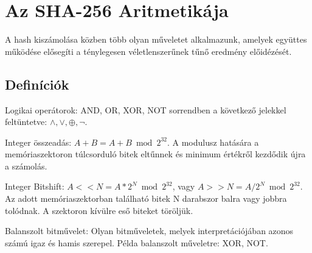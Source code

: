 \section{Az SHA-256 Aritmetikája}

A hash kiszámolása közben több olyan műveletet alkalmazunk, amelyek együttes működése elősegíti a ténylegesen véletlenszerűnek tűnő eredmény előidézését.



\subsection{Definíciók}


\begin{definition}
Logikai operátorok: AND, OR, XOR, NOT sorrendben a következő jelekkel feltüntetve: $\land, \lor, \oplus, \neg$.
\end{definition}

\begin{definition}
Integer összeadás: $A + B = A + B \bmod 2^{32} $. A modulusz hatására a memóriaszektoron túlcsorduló bitek eltűnnek és minimum értékről kezdődik újra a számolás.
\end{definition}

\begin{definition}
Integer Bitshift: $A << N = A * 2^{N} \bmod 2^{32}$, vagy $A >> N = A / 2^{N} \bmod 2^{32}$. Az adott memóriaszektorban található bitek N darabszor balra vagy jobbra tolódnak. A szektoron kívülre eső biteket töröljük.
\end{definition}

\begin{definition}
Balanszolt bitművelet: Olyan bitműveletek, melyek interpretációjában azonos számú igaz és hamis szerepel. Példa balanszolt műveletre: XOR, NOT.
\end{definition}


